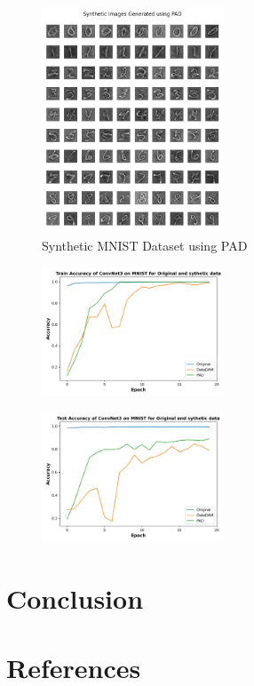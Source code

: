 \documentclass[conference, compsoc]{IEEEtran}
\begin{document}
\begin{figure}[H]
	\centering
	\includegraphics[width=0.48\textwidth]{synthetic_images_task2.png}
	\caption{Synthetic MNIST Dataset using PAD\cite{li2024prioritizealignmentdatasetdistillation}}
	\label{fig:synthetic_images_task2}
\end{figure}

\begin{figure}[H]
	\centering
	\includegraphics[width=0.48\textwidth]{train_acc_task2.png}
	\caption{}
	\label{fig:train_acc_task2}
\end{figure}

\begin{figure}[H]
	\centering
	\includegraphics[width=0.48\textwidth]{test_acc_task2.png}
	\caption{}
	\label{fig:test_acc_task2}
\end{figure}

\section{Conclusion}

\section{References}
\nocite{*}
\printbibliography
\end{document}
